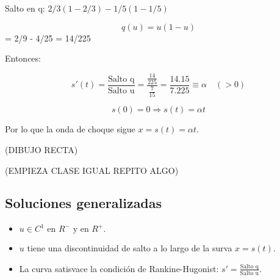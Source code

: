 		Salto en q: $2/3(1-2/3) - 1/5(1-1/5)$

		$$q(u) = u (1-u)$$ = 2/9 - 4/25 = 14/225


		Entonces:

		$$s'(t) = \frac{\text{Salto q}}{\text{Salto u}} = \frac{\frac{14}{225}}{\frac{7}{15}} = \frac{14.15}{7.225} \equiv \alpha \quad(>0)$$

		$$s(0) = 0 \Rightarrow s(t) = \alpha t $$

		Por lo que la onda de choque sigue $x = s(t) = \alpha t$.

		(DIBUJO RECTA)


		(EMPIEZA CLASE IGUAL REPITO ALGO)


		\subsection{Soluciones generalizadas}

			\begin{itemize}

				\item $ u \in C^1 \text{ en } R^{-} \text{ y en } R^{+}. $
				\item $u$ tiene una discontinuidad de salto a lo largo de la surva $x = s(t)$.
				\item La curva satisvace la condición de Rankine-Hugonist: $s' = \frac{\text{Salto q}}{\text{Salto u}}$.

			\end{itemize}

